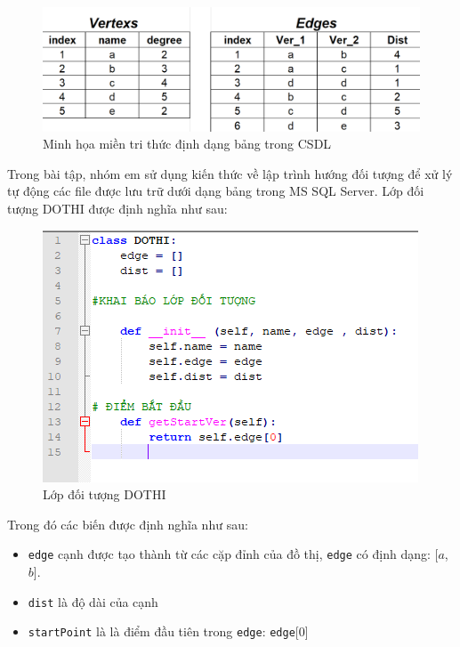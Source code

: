 \begin{figure}[h]
	\centering
	\includegraphics[width= 0.9\linewidth]{tables.PNG}
	\caption{Minh họa miền tri thức định dạng bảng trong CSDL}
	\label{fig-3: dinh dang mien-tri-thuc}
\end{figure}

Trong bài tập, nhóm em sử dụng kiến thức về lập trình hướng đối tượng để xử lý tự động các file được lưu trữ dưới dạng bảng trong MS SQL Server. Lớp đối tượng DOTHI được định nghĩa như sau:

\begin{figure}[h]
	\centering
	\includegraphics[width=0.8 \linewidth]{DOTHI.PNG}
	\caption{Lớp đối tượng DOTHI}
	\label{fig-3:lop doi tuong do thi}
\end{figure}


Trong đó các biến được định nghĩa như sau:
\begin{itemize}
	\item \texttt{edge} cạnh được tạo thành từ các cặp đỉnh của đồ thị, \texttt{edge} có định dạng: [$a$, $b$].
	\item \texttt{dist} là độ dài của cạnh
	\item \texttt{startPoint} là là điểm đầu tiên trong \texttt{edge}: \texttt{edge}[0]
\end{itemize}